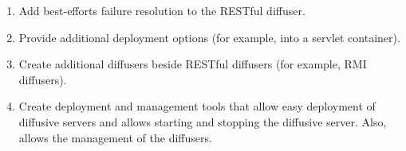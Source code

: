 \documentclass[11pt]{article}
\begin{document}
\begin{enumerate}
\item Add best-efforts failure resolution to the RESTful diffuser.
\item Provide additional deployment options (for example, into a servlet container).
\item Create additional diffusers beside RESTful diffusers (for example, RMI diffusers).
\item Create deployment and management tools that allow easy deployment of diffusive servers and allows starting and stopping the diffusive server. Also, allows the management of the diffusers.
\end{enumerate}
\end{document}
